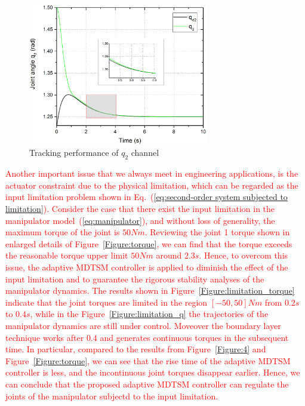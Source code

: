 \documentclass[3p]{elsarticle}
\theoremstyle{plain}
\theoremstyle{remark}
\begin{document}
\begin{figure}
\centering
\includegraphics[width=0.7\textwidth]{paper3_fig7.eps}
\caption{Tracking performance of $q_2$ channel}
\label{Figure:7}
\end{figure}
\textcolor{red}{Another important issue that we always meet in engineering applications, is the actuator constraint due to the physical limitation, which can be regarded as the input limitation problem shown in Eq.~(\ref{eq:second-order system subjected to limitation}). Consider the case that there exist the input limitation in the manipulator model~(\ref{eq:manipulator}), and without loss of generality, the maximum torque of the joint is $50Nm$. Reviewing the joint 1 torque shown in enlarged details of  Figure~\ref{Figure:torque}, we can find that the torque exceeds the reasonable torque upper limit $50Nm$ around $2.3s$. Hence, to overcom this issue, the adaptive MDTSM controller is applied to diminish the effect of the input limitation and to guarantee the rigorous stability analyses of the manipulator dynamics. The results shown in Figure~\ref{Figure:limitation_torque} indicate that the joint torques are limited in the region $[-50,50]Nm$ from $0.2s$ to $0.4s$, while in the Figure~\ref{Figure:limitation_q} the trajectories of the manipulator dynamics are still under control. Moveover the boundary layer technique works after $0.4$ and generates continuous torques in the subsequent time. In particular, compared to the results from Figure~\ref{Figure:4} and Figure~\ref{Figure:torque}, we can see that the rise time of the adaptive MDTSM controller is less, and the incontinuous joint torques disappear earlier. Hence, we can conclude that the proposed adaptive MDTSM controller can regulate the joints of the manipulator subjectd to the input limitation.}
\end{document}
